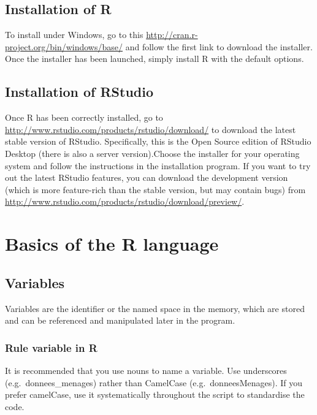 \documentclass[
]{book}
\begin{document}
\hypertarget{installation-of-r}{%
\section{Installation of R}\label{installation-of-r}}

To install under Windows, go to this \url{http://cran.r-project.org/bin/windows/base/} and follow the first link to download the installer. Once the installer has been launched, simply install R with the default options.

\hypertarget{installation-of-rstudio}{%
\section{Installation of RStudio}\label{installation-of-rstudio}}

Once R has been correctly installed, go to \url{http://www.rstudio.com/products/rstudio/download/} to download the latest stable version of RStudio. Specifically, this is the Open Source edition of RStudio Desktop (there is also a server version).Choose the installer for your operating system and follow the instructions in the installation program. If you want to try out the latest RStudio features, you can download the development version (which is more feature-rich than the stable version, but may contain bugs) from
\url{http://www.rstudio.com/products/rstudio/download/preview/}.

\hypertarget{basics-of-the-r-language}{%
\chapter{Basics of the R language}\label{basics-of-the-r-language}}

\hypertarget{variables}{%
\section{Variables}\label{variables}}

Variables are the identifier or the named space in the memory, which are stored and can be referenced and manipulated later in the program.

\hypertarget{rule-variable-in-r}{%
\subsection*{Rule variable in R}\label{rule-variable-in-r}}

It is recommended that you use nouns to name a variable. Use underscores (e.g.~donnees\_menages) rather than CamelCase (e.g.~donneesMenages). If you prefer camelCase, use it systematically throughout the script to standardise the code.
\end{document}
